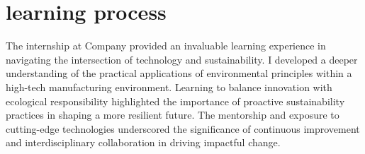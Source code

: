 \section{learning process}
The internship at Company provided an invaluable learning experience in navigating the intersection of technology and sustainability. I developed a deeper understanding of the practical applications of environmental principles within a high-tech manufacturing environment. Learning to balance innovation with ecological responsibility highlighted the importance of proactive sustainability practices in shaping a more resilient future. The mentorship and exposure to cutting-edge technologies underscored the significance of continuous improvement and interdisciplinary collaboration in driving impactful change. \cite{EOS}
